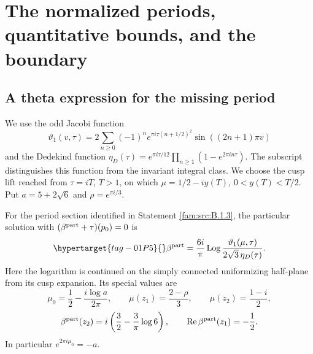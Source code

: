 \section{The normalized periods, quantitative bounds, and the boundary}\hypertarget{tag-01PK}{}\label{fam:section:C}

\subsection{A theta expression for the missing period}\hypertarget{tag-01PL}{}\label{fam:section:C.1}
We use the odd Jacobi function
\[
 \vartheta_1(v,\tau)=2\sum_{n\geq0}(-1)^n
 e^{\pi i\tau(n+1/2)^2}\sin((2n+1)\pi v)
\]
and the Dedekind function
\(\eta_D(\tau)=e^{\pi i\tau/12}\prod_{n\geq1}(1-e^{2\pi in\tau})\).
The subscript distinguishes this function from the invariant integral class.
We choose the cusp lift reached from \(\tau=iT\), \(T>1\), on which
\(\mu=1/2-iy(T)\), \(0<y(T)<T/2\). Put
\(a=5+2\sqrt6\) and \(\rho=e^{\pi i/3}\).

\begin{proposition}\hypertarget{tag-01QH}{}\label{fam:src:C.1.1}\label{fam:st:C.1.1}

For the period section identified in Statement \ref{fam:src:B.1.3}, the particular solution
with \((\beta^{\rm part}+\tau)(p_0)=0\) is
\begin{equation}\hypertarget{tag-01P5}{}\label{fam:eq:cd-beta}
 \beta^{\rm part}=\frac{6i}{\pi}\operatorname{Log}
 \frac{\vartheta_1(\mu,\tau)}{2\sqrt3\,\eta_D(\tau)}.
\end{equation}
Here the logarithm is continued on the simply connected uniformizing
half-plane from its cusp expansion. Its special values are
\[
 \mu_0=\frac12-\frac{i\log a}{2\pi},\qquad
 \mu(z_1)=\frac{2-\rho}{3},\qquad \mu(z_2)=\frac{1-i}{2},
\]
\[
 \beta^{\rm part}(z_2)=i\left(\frac32-\frac3\pi\log6\right),
 \qquad \operatorname{Re}\beta^{\rm part}(z_1)=-\frac12.
\]
In particular \(e^{2\pi i\mu_0}=-a\).
\end{proposition}


